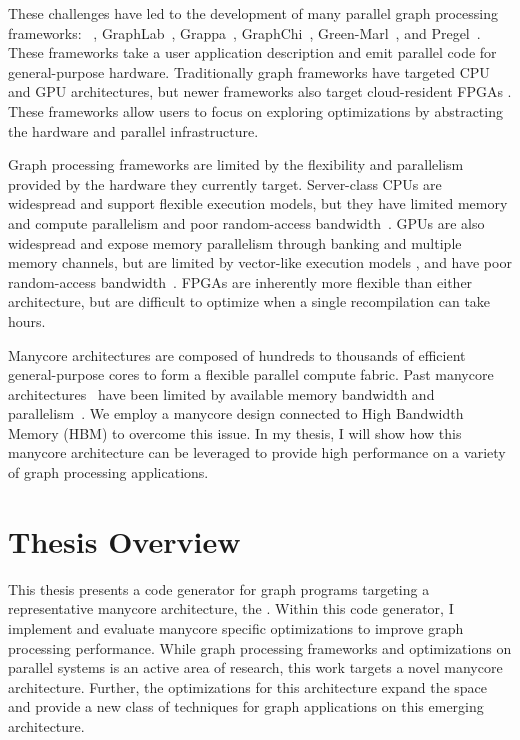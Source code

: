 These challenges have led to the development of many parallel graph processing frameworks: \graphit~\cite{zhang2018graphit,brahmakshatriya2021compiling,zhang2019optimizing}, GraphLab~\cite{low2010graphlab, low2012distributed}, Grappa~\cite{nelson2015grappa}, GraphChi~\cite{aapo2012graphchi}, Green-Marl~\cite{hong2012green}, and Pregel~\cite{malewicz2010pregel}. 
These frameworks take a user application description and emit parallel code for general-purpose hardware.
Traditionally graph frameworks have targeted CPU and GPU architectures, but newer frameworks also target cloud-resident FPGAs \cite{engelhardt2016gravf, dai2016fpgp}.
These frameworks allow users to focus on exploring optimizations by abstracting the hardware and parallel infrastructure.

Graph processing frameworks are limited by the flexibility and parallelism provided by the hardware they currently target.
Server-class CPUs are widespread and support flexible execution models, but they have limited memory and compute parallelism and poor random-access bandwidth~\citep{beamer2015locality}.
GPUs are also widespread and expose memory parallelism through banking and multiple memory channels, but are limited by vector-like execution models \cite{xu2014graph, shi2018graph}, and have poor random-access bandwidth~\citep{aamodt2018general}.
FPGAs are inherently more flexible than either architecture, but are difficult to optimize when a single recompilation can take hours. 
  
Manycore architectures are composed of hundreds to thousands of efficient general-purpose cores to form a flexible parallel compute fabric.
Past manycore architectures~\cite{ramey2011tilera, agathos2015parallela, gwennap2011adapteva} have been limited by available memory bandwidth and parallelism~\citep{loi2010efficient}.  We employ a manycore design connected to High Bandwidth Memory (HBM) \cite{jedec2020hbm, jouppi2017datacenter} to overcome this issue.
In my thesis, I will show how this manycore architecture can be leveraged to provide high performance on a variety of graph processing applications.


\section{Thesis Overview}
This thesis presents a code generator for graph programs targeting a representative manycore architecture, the \hbmc. 
Within this code generator, I implement and evaluate manycore specific optimizations to improve graph processing performance. 
While graph processing frameworks and optimizations on parallel systems is an active area of research, this work targets a novel manycore architecture.
Further, the optimizations for this architecture expand the space and provide a new class of techniques for graph applications on this emerging architecture. 

